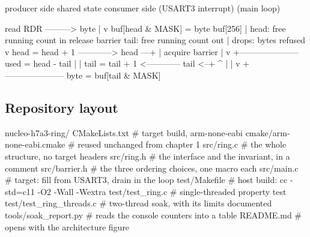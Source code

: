 \begin{asciiart}
  producer side                      shared state                consumer side
  (USART3 interrupt)                                             (main loop)

  read RDR ---------> byte
                        |
                        v
                   buf[head & MASK] = byte        buf[256]
                        |                         head: free running count in
                   release barrier                tail: free running count out
                        |                         drops: bytes refused
                        v
                   head = head + 1  ------------> head ---+
                                                          |
                                                    acquire barrier
                                                          |
                                                          v
                        +---------------------  used = head - tail
                        |                                 |
                   tail = tail + 1  <------------ tail <--+
                        ^                                 |
                        |                                 v
                        +--------------------- byte = buf[tail & MASK]
\end{asciiart}

\subsection*{Repository layout}

\begin{plaincode}
nucleo-h7a3-ring/
  CMakeLists.txt                # target build, arm-none-eabi
  cmake/arm-none-eabi.cmake     # reused unchanged from chapter 1
  src/ring.c                    # the whole structure, no target headers
  src/ring.h                    # the interface and the invariant, in a comment
  src/barrier.h                 # the three ordering choices, one macro each
  src/main.c                    # target: fill from USART3, drain in the loop
  test/Makefile                 # host build: cc -std=c11 -O2 -Wall -Wextra
  test/test_ring.c              # single-threaded property test
  test/test_ring_threads.c      # two-thread soak, with its limits documented
  tools/soak_report.py          # reads the console counters into a table
  README.md                     # opens with the architecture figure
\end{plaincode}

